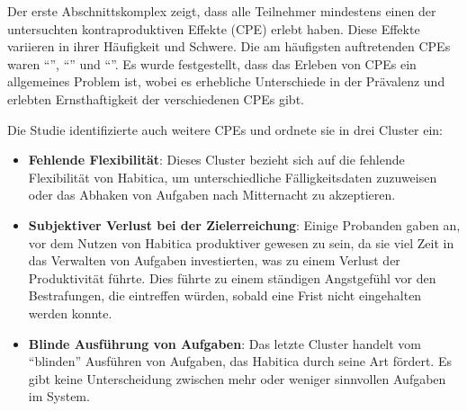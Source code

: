 \documentclass[sigconf, nonacm]{acmart}
\begin{document}
Der erste Abschnittskomplex zeigt, dass alle Teilnehmer mindestens einen der untersuchten kontraproduktiven Effekte (CPE) erlebt haben. Diese Effekte variieren in ihrer Häufigkeit und Schwere. Die am häufigsten auftretenden CPEs waren \enquote{}, \enquote{} und \enquote{}. Es wurde festgestellt, dass das Erleben von CPEs ein allgemeines Problem ist, wobei es erhebliche Unterschiede in der Prävalenz und erlebten Ernsthaftigkeit der verschiedenen CPEs gibt.

Die Studie identifizierte auch weitere CPEs und ordnete sie in drei Cluster ein:
\begin{itemize}
	\item \textbf{Fehlende Flexibilität}: Dieses Cluster bezieht sich auf die fehlende Flexibilität von Habitica, um unterschiedliche Fälligkeitsdaten zuzuweisen oder das Abhaken von Aufgaben nach Mitternacht zu akzeptieren.
	\item \textbf{Subjektiver Verlust bei der Zielerreichung}: Einige Probanden gaben an, vor dem Nutzen von Habitica produktiver gewesen zu sein, da sie viel Zeit in das Verwalten von Aufgaben investierten, was zu einem Verlust der Produktivität führte. Dies führte zu einem ständigen Angstgefühl vor den Bestrafungen, die eintreffen würden, sobald eine Frist nicht eingehalten werden konnte.
	\item \textbf{Blinde Ausführung von Aufgaben}: Das letzte Cluster handelt vom “blinden” Ausführen von Aufgaben, das Habitica durch seine Art fördert. Es gibt keine Unterscheidung zwischen mehr oder weniger sinnvollen Aufgaben im System.
\end{itemize}
\end{document}
